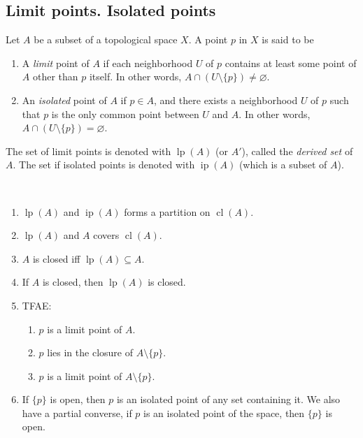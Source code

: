 \documentclass{treatise}
\begin{document}
\subsection{Limit points. Isolated points}
Let $A$ be a subset of a topological space $X$. A point $p$ in $X$ is said to be
\begin{enumerate}
    \item A \emph{limit} point of $A$ if each neighborhood $U$ of $p$ contains at least some point of $A$ other than $p$ itself. In other words, $A \cap (U \setminus \{ p \}) \neq \varnothing$.
    \item An \emph{isolated} point of $A$ if $p \in A$, and there exists a neighborhood $U$ of $p$ such that $p$ is the only common point between $U$ and $A$. In other words, $A \cap (U \setminus \{ p \}) = \varnothing$.
\end{enumerate}
The set of limit points is denoted with $\operatorname{lp}(A)$ (or $A'$), called the \emph{derived set} of $A$. The set if isolated points is denoted with $\operatorname{ip}(A)$ (which is a subset of $A$).
\begin{proposition} \label{lim-iso-topo-prop} \ 
\begin{enumerate}
    \item $\operatorname{lp}(A)$ and $\operatorname{ip}(A)$ forms a partition on $\operatorname{cl}(A)$.
    \item $\operatorname{lp}(A)$ and $A$ covers $\operatorname{cl}(A)$.
    \item $A$ is closed iff $\operatorname{lp}(A) \subseteq A$.
    \item If $A$ is closed, then $\operatorname{lp}(A)$ is closed.
    \item TFAE:
    \begin{enumerate}
        \item $p$ is a limit point of $A$.
        \item $p$ lies in the closure of $A \setminus \{ p \}$.
        \item $p$ is a limit point of $A \setminus \{ p \}$.
    \end{enumerate}
    \item If $\{ p \}$ is open, then $p$ is an isolated point of any set containing it. We also have a partial converse, if $p$ is an isolated point of the space, then $\{ p \}$ is open.
\end{enumerate}
\end{proposition}
\end{document}
